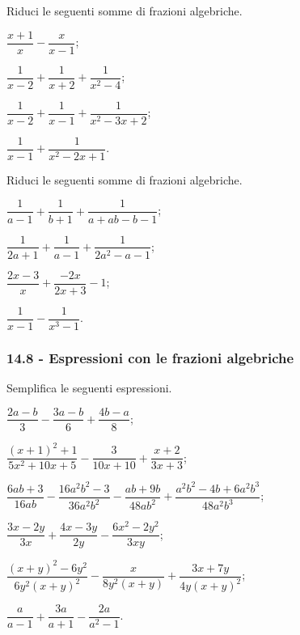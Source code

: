 \begin{esercizio}[\Ast]
\label{ese:14.27}
Riduci le seguenti somme di frazioni algebriche.
\begin{multicols}{2}
\begin{enumeratea}
 \item $\dfrac{x+1}{x}-\dfrac{x}{x-1}$;
 \item $\dfrac{1}{x-2}+\dfrac{1}{x+2}+\dfrac{1}{x^{{2}}-4}$;
 \item $\dfrac{1}{x-2}+\dfrac{1}{x-1}+\dfrac{1}{x^{{2}}-3x+2}$;
 \item $\dfrac{1}{x-1}+\dfrac{1}{x^{2}-2x+1}$.
\end{enumeratea}
\end{multicols}
\end{esercizio}

\begin{esercizio}[\Ast]
\label{ese:14.28}
Riduci le seguenti somme di frazioni algebriche.
\begin{multicols}{2}
\begin{enumeratea}
 \item $\dfrac{1}{a-1}+\dfrac{1}{b+1}+\dfrac{1}{a+ab-b-1}$;
 \item $\dfrac{1}{2a+1}+\dfrac{1}{a-1}+\dfrac{1}{2a^{2}-a-1}$;
 \item $\dfrac{2x-3}{x}+\dfrac{-2x}{2x+3}-1$;
 \item $\dfrac{1}{x-1}-\dfrac{1}{x^{3}-1}$.
\end{enumeratea}
\end{multicols}
\end{esercizio}

\subsubsection*{14.8 - Espressioni con le frazioni algebriche}

\begin{esercizio}[\Ast]
\label{ese:14.29}
Semplifica le seguenti espressioni.
\begin{enumeratea}
 \item $\dfrac{2a-b}{3}-\dfrac{3a-b}{6}+\dfrac{4b-a}{8}$;
 \item $\dfrac{(x+1)^{2}+1}{5x^{2}+10x+5}-\dfrac{3}{10x+10}+\dfrac{x+2}{3x+3}$;
 \item $\dfrac{6ab+3}{16ab}-\dfrac{16a^{2}b^{2}-3}{36a^{2}b^{2}}-\dfrac{ab+9b}{48ab^{2}}+\dfrac{a^{2}b^{2}-4b+6a^{2}b^{3}}{48a^{2}b^{3}}$;
 \item $\dfrac{3x-2y}{3x}+\dfrac{4x-3y}{2y}-\dfrac{6x^{2}-2y^{2}}{3xy}$;
 \item $\dfrac{(x+y)^{2}-6y^{2}}{6y^{2}(x+y)^{2}}-\dfrac{x}{8y^{2}(x+y)}+\dfrac{3x+7y}{4y(x+y)^{2}}$;
 \item $\dfrac{a}{a-1}+\dfrac{3a}{a+1}-\dfrac{2a}{a^{2}-1}$.
\end{enumeratea}
\end{esercizio}

